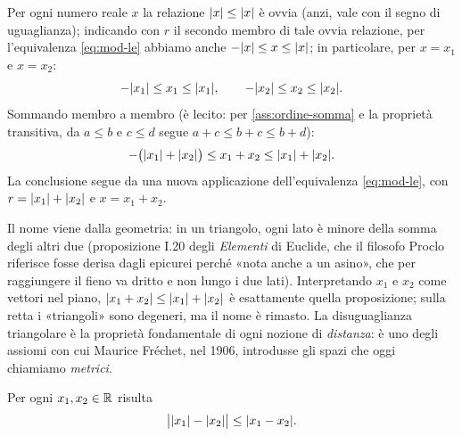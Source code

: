 \begin{dimostrazione}
Per ogni numero reale $x$ la relazione $\lvert x\rvert\le\lvert x\rvert$ è ovvia (anzi, vale con il
segno di uguaglianza); indicando con $r$ il secondo membro di tale ovvia relazione, per
l'equivalenza \eqref{eq:mod-le} abbiamo anche $-\lvert x\rvert\le x\le\lvert x\rvert$; in particolare,
per $x=x_{1}$ e $x=x_{2}$:
\begin{equation}\label{eq:triang-passo1}
  -\lvert x_{1}\rvert\le x_{1}\le\lvert x_{1}\rvert, \qquad -\lvert x_{2}\rvert\le x_{2}\le\lvert x_{2}\rvert.
\end{equation}
Sommando membro a membro (è lecito: per \ref{ass:ordine-somma} e la proprietà
transitiva, da $a\le b$ e $c\le d$ segue $a+c\le b+c\le b+d$):
\begin{equation}\label{eq:triang-passo2}
  -\bigl(\lvert x_{1}\rvert+\lvert x_{2}\rvert\bigr)\le x_{1}+x_{2}\le\lvert x_{1}\rvert+\lvert x_{2}\rvert.
\end{equation}
La conclusione segue da una nuova applicazione dell'equivalenza \eqref{eq:mod-le}, con
$r=\lvert x_{1}\rvert+\lvert x_{2}\rvert$ e $x=x_{1}+x_{2}$.
\end{dimostrazione}

\begin{notastorica}
Il nome viene dalla geometria: in un triangolo, ogni lato è minore della somma degli
altri due (proposizione I.20 degli \emph{Elementi} di Euclide, che il filosofo Proclo
riferisce fosse derisa dagli epicurei perché «nota anche a un asino», che per
raggiungere il fieno va dritto e non lungo i due lati). Interpretando $x_{1}$ e $x_{2}$
come vettori nel piano, $\lvert x_{1}+x_{2}\rvert\le\lvert x_{1}\rvert+\lvert x_{2}\rvert$ è esattamente
quella proposizione; sulla retta i «triangoli» sono degeneri, ma il nome è rimasto. La
disuguaglianza triangolare è la proprietà fondamentale di ogni nozione di
\emph{distanza}: è uno degli assiomi con cui Maurice Fréchet, nel 1906, introdusse gli
spazi che oggi chiamiamo \emph{metrici}.
\end{notastorica}

\begin{corollario}\label{cor:triangolare-inversa}
Per ogni $x_{1},x_{2}\in\mathbb{R}$ risulta
\begin{equation}\label{eq:triangolare-inversa}
  \bigl|\lvert x_{1}\rvert-\lvert x_{2}\rvert\bigr|\le\lvert x_{1}-x_{2}\rvert.
\end{equation}
\end{corollario}

\begin{schema}
\end{schema}

